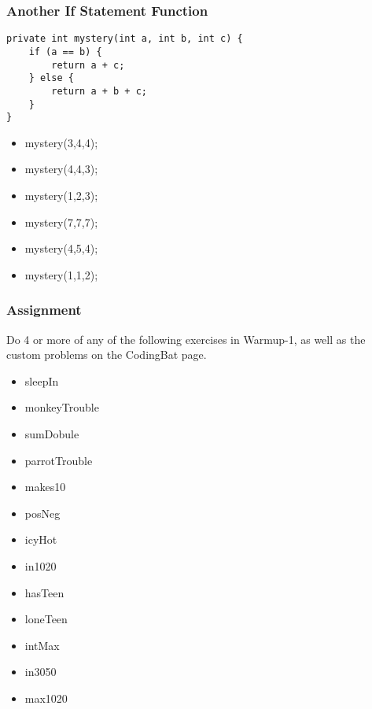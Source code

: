 \documentclass{beamer}
\begin{document}
\begin{frame}[fragile]
\frametitle{Another If Statement Function}
\begin{lstlisting}
private int mystery(int a, int b, int c) {
    if (a == b) {
        return a + c;
    } else {
        return a + b + c;
    }
}
\end{lstlisting}
\begin{itemize}
\item<2->mystery(3,4,4);
\item<3->mystery(4,4,3);
\item<4->mystery(1,2,3);
\item<5->mystery(7,7,7);
\item<6->mystery(4,5,4);
\item<7->mystery(1,1,2);
\end{itemize}
\end{frame}

\begin{frame}
\frametitle{Assignment}
Do 4 or more of any of the following exercises in Warmup-1, as well as the custom problems on the CodingBat page.
\begin{itemize}
\item sleepIn
\item monkeyTrouble
\item sumDobule
\item parrotTrouble
\item makes10
\item posNeg
\item icyHot
\item in1020
\item hasTeen
\item loneTeen
\item intMax
\item in3050
\item max1020
\end{itemize}
\end{frame}
\end{document}
